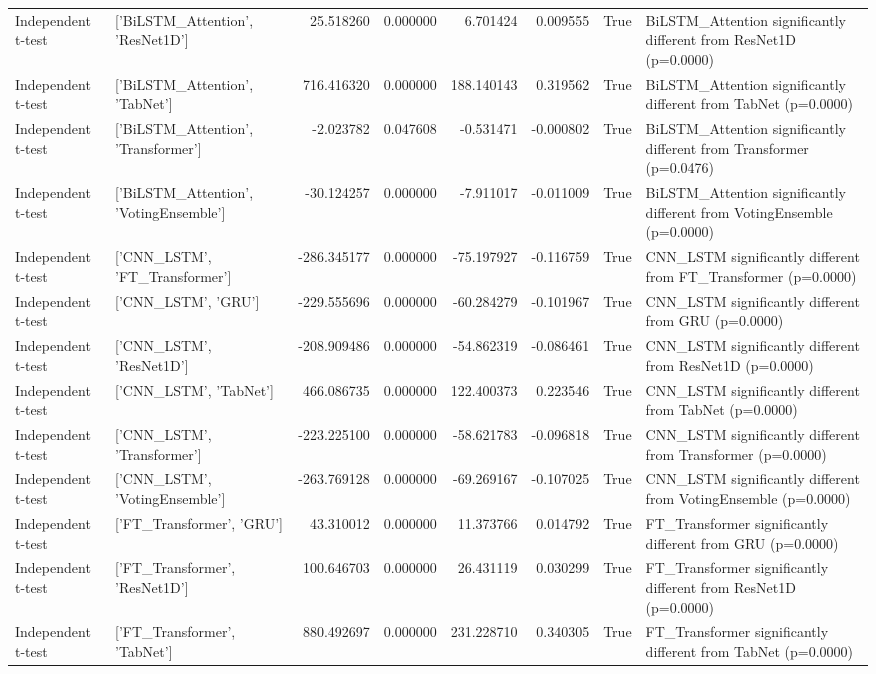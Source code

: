 \begin{table}
\begin{tabular}{llrrrrrl}
Independent t-test & ['BiLSTM_Attention', 'ResNet1D'] & 25.518260 & 0.000000 & 6.701424 & 0.009555 & True & BiLSTM_Attention significantly different from ResNet1D (p=0.0000) \\
Independent t-test & ['BiLSTM_Attention', 'TabNet'] & 716.416320 & 0.000000 & 188.140143 & 0.319562 & True & BiLSTM_Attention significantly different from TabNet (p=0.0000) \\
Independent t-test & ['BiLSTM_Attention', 'Transformer'] & -2.023782 & 0.047608 & -0.531471 & -0.000802 & True & BiLSTM_Attention significantly different from Transformer (p=0.0476) \\
Independent t-test & ['BiLSTM_Attention', 'VotingEnsemble'] & -30.124257 & 0.000000 & -7.911017 & -0.011009 & True & BiLSTM_Attention significantly different from VotingEnsemble (p=0.0000) \\
Independent t-test & ['CNN_LSTM', 'FT_Transformer'] & -286.345177 & 0.000000 & -75.197927 & -0.116759 & True & CNN_LSTM significantly different from FT_Transformer (p=0.0000) \\
Independent t-test & ['CNN_LSTM', 'GRU'] & -229.555696 & 0.000000 & -60.284279 & -0.101967 & True & CNN_LSTM significantly different from GRU (p=0.0000) \\
Independent t-test & ['CNN_LSTM', 'ResNet1D'] & -208.909486 & 0.000000 & -54.862319 & -0.086461 & True & CNN_LSTM significantly different from ResNet1D (p=0.0000) \\
Independent t-test & ['CNN_LSTM', 'TabNet'] & 466.086735 & 0.000000 & 122.400373 & 0.223546 & True & CNN_LSTM significantly different from TabNet (p=0.0000) \\
Independent t-test & ['CNN_LSTM', 'Transformer'] & -223.225100 & 0.000000 & -58.621783 & -0.096818 & True & CNN_LSTM significantly different from Transformer (p=0.0000) \\
Independent t-test & ['CNN_LSTM', 'VotingEnsemble'] & -263.769128 & 0.000000 & -69.269167 & -0.107025 & True & CNN_LSTM significantly different from VotingEnsemble (p=0.0000) \\
Independent t-test & ['FT_Transformer', 'GRU'] & 43.310012 & 0.000000 & 11.373766 & 0.014792 & True & FT_Transformer significantly different from GRU (p=0.0000) \\
Independent t-test & ['FT_Transformer', 'ResNet1D'] & 100.646703 & 0.000000 & 26.431119 & 0.030299 & True & FT_Transformer significantly different from ResNet1D (p=0.0000) \\
Independent t-test & ['FT_Transformer', 'TabNet'] & 880.492697 & 0.000000 & 231.228710 & 0.340305 & True & FT_Transformer significantly different from TabNet (p=0.0000) \\

\end{tabular}
\end{table}
